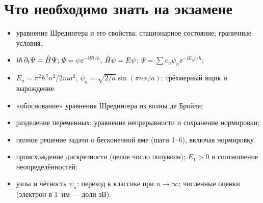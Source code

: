 \section{Что необходимо знать на экзамене}

\begin{examcheck}
\begin{itemize}
 \item уравнение Шредингера и его свойства; стационарное состояние; граничные условия.
\end{itemize}
\begin{itemize}
 \item $\mathrm{i}\hbar\,\partial_t\Psi=\hat{H}\Psi$; $\Psi=\psi\ee^{-\ii Et/\hbar}$, $\hat{H}\psi=E\psi$; $\Psi=\sum c_n\psi_n\ee^{-\ii E_nt/\hbar}$;
 \item $E_n=\pi^2\hbar^2n^2/2ma^2$, $\psi_n=\sqrt{2/a}\sin(\pi nx/a)$; трёхмерный ящик и вырождение.
\end{itemize}
\begin{itemize}
 \item «обоснование» уравнения Шредингера из волны де Бройля;
 \item разделение переменных; уравнение непрерывности и сохранение нормировки;
 \item полное решение задачи о бесконечной яме (шаги 1--6), включая нормировку.
\end{itemize}
\begin{itemize}
 \item происхождение дискретности (целое число полуволн); $E_1>0$ и соотношение неопределённостей;
 \item узлы и чётность $\psi_n$; переход к классике при $n\to\infty$; численные оценки (электрон в 1~нм — доли эВ).
\end{itemize}
\end{examcheck}
